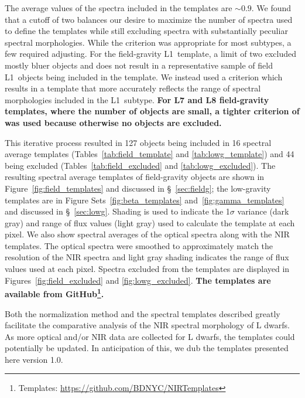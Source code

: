 \documentclass[modern,trackchanges]{aastex61}
\begin{document}
The average  values of the spectra included in the templates are $\sim0.9$.
We found that a  cutoff of two balances our desire to maximize the number of spectra used to define the templates while still excluding spectra with substantially peculiar spectral morphologies.
While the  criterion was appropriate for most subtypes, a few required adjusting.
For the field-gravity L1~template, a  limit of two excluded mostly bluer objects and does not result in a representative sample of field L1~objects being included in the template.
We instead used a  criterion which results in a template that more accurately reflects the range of spectral morphologies included in the L1~subtype.
\textbf{For L7 and L8 field-gravity templates, where the number of objects are small, a tighter criterion of  was used because otherwise no objects are excluded.}

This iterative process resulted in 127 objects being included in 16 spectral average templates (Tables~\ref{tab:field_template} and \ref{tab:lowg_template}) and 44 being excluded (Tables~\ref{tab:field_excluded} and \ref{tab:lowg_excluded}).
The resulting spectral average templates of field-gravity objects are shown in Figure~\ref{fig:field_templates} and discussed in \S~\ref{sec:fieldg}; the low-gravity templates are in Figure Sets~\ref{fig:beta_templates} and~\ref{fig:gamma_templates} and discussed in \S~\ref{sec:lowg}.
Shading is used to indicate the 1$\sigma$ variance (dark gray) and range of flux values (light gray) used to calculate the template at each pixel.
We also show spectral averages of the optical spectra along with the NIR templates. The optical spectra were smoothed to approximately match the resolution of the NIR spectra and light gray shading indicates the range of flux values used at each pixel.
Spectra excluded from the templates are displayed in Figures~\ref{fig:field_excluded} and \ref{fig:lowg_excluded}.
\textbf{The templates are available from GitHub\footnote{Templates: \url{https://github.com/BDNYC/NIRTemplates}}.}

Both the normalization method and the spectral templates described greatly facilitate the comparative analysis of the NIR spectral morphology of L dwarfs.
As more optical and/or NIR data are collected for L dwarfs, the templates could potentially be updated.
In anticipation of this, we dub the templates presented here version 1.0.
\end{document}
